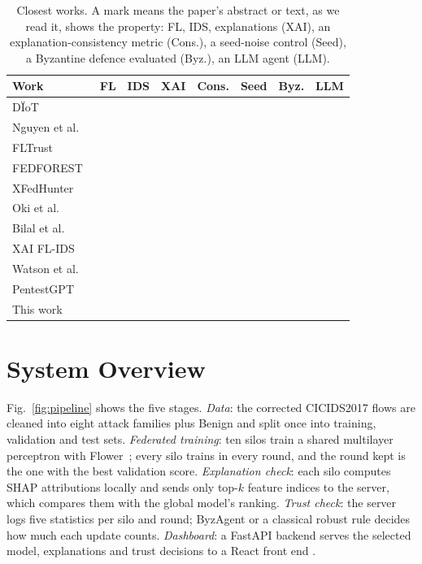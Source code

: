 \documentclass[conference]{IEEEtran}
\newif\iffullversion
\newcommand{\cmark}{\checkmark}
\begin{document}
\begin{table}[t]
\centering
\caption{Closest works. A mark means the paper's abstract or text, as we read it, shows
the property: FL, IDS, explanations (XAI), an explanation-consistency metric (Cons.), a
seed-noise control (Seed), a Byzantine defence evaluated (Byz.), an LLM agent (LLM).}
\label{tab:related}
\footnotesize
\setlength{\tabcolsep}{2.6pt}
\begin{tabular}{@{}lccccccc@{}}
\toprule
Work & FL & IDS & XAI & Cons. & Seed & Byz. & LLM\\
\midrule
D\"IoT~\cite{nguyen2019diot} & \cmark & \cmark & & & & & \\
Nguyen et al.~\cite{nguyen2020poison} & \cmark & \cmark & & & & \cmark & \\
FLTrust~\cite{cao2021fltrust} & \cmark & & & & & \cmark & \\
FEDFOREST~\cite{dong2022fedforest} & \cmark & \cmark & \cmark & & & & \\
XFedHunter~\cite{thi2023xfedhunter} & \cmark & \cmark & \cmark & & & & \\
Oki et al.~\cite{oki2024} & \cmark & \cmark & \cmark & \cmark & & & \\
Bilal et al.~\cite{bilal2025} & \cmark & \cmark & \cmark & & & & \\
XAI FL-IDS~\cite{gholamrezazadeh2026} & \cmark & \cmark & \cmark & & & & \\
Watson et al.~\cite{watson2022} & & & \cmark & \cmark & \cmark & & \\
PentestGPT~\cite{deng2024pentestgpt} & & & & & & & \cmark\\
\midrule
This work & \cmark & \cmark & \cmark & \cmark & \cmark & \cmark & \cmark\\
\bottomrule
\end{tabular}
\end{table}

\section{System Overview}
\label{sec:system}

Fig.~\ref{fig:pipeline} shows the five stages. \emph{Data}: the corrected CICIDS2017
flows are cleaned into eight attack families plus Benign and split once into training,
validation and test sets. \emph{Federated training}: ten silos train a shared multilayer
perceptron with Flower~\cite{beutel2020flower}; every silo trains in every round, and
the round kept is the one with the best validation score. \emph{Explanation check}:
each silo computes SHAP attributions locally and sends only top-$k$ feature indices to
the server, which compares them with the global model's ranking. \emph{Trust check}: the
server logs five statistics per silo and round; ByzAgent or a classical robust rule
decides how much each update counts. \emph{Dashboard}: a FastAPI backend serves the
selected model, explanations and trust decisions to a React front end
\iffullversion (Fig.~\ref{fig:dashlive})\fi.
\end{document}
